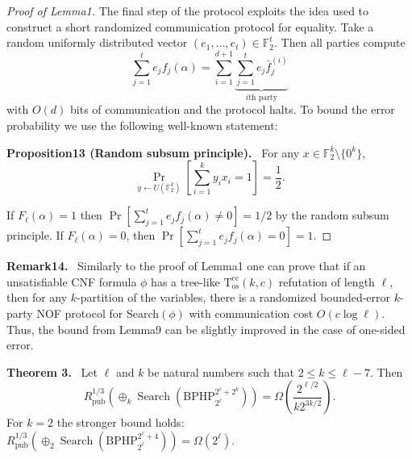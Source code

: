 \documentclass[10pt,a4paper]{article}
\newenvironment{authorclaim}[1]{\par\medskip\noindent\textbf{#1.}\ \ignorespaces}{\par\medskip}
\begin{document}
\begin{proof}[Proof of Lemma1]
The final step of the protocol exploits the idea used to construct a short randomized communication protocol for equality. Take a random uniformly distributed vector $(e_1,\ldots,e_t)\in\mathbb F_2^t$. Then all parties compute
\[\sum_{j=1}^te_jf_j(\alpha)=\sum_{i=1}^{d+1}\underbrace{\sum_{j=1}^te_j\bar f_j^{(i)}}_{i\text{th party}}\]
with $O(d)$ bits of communication and the protocol halts. To bound the error probability we use the following well-known statement:
\begin{authorclaim}{Proposition13 (Random subsum principle)}
For any $x\in\mathbb F_2^k\setminus\{0^k\}$,
\[\Pr_{y\leftarrow U(\mathbb F_2^k)}\left[\sum_{i=1}^ky_ix_i=1\right]=\frac12.\]
\end{authorclaim}
If $F_\ell(\alpha)=1$ then $\Pr[\sum_{j=1}^te_jf_j(\alpha)\ne0]=1/2$ by the random subsum principle. If $F_\ell(\alpha)=0$, then $\Pr[\sum_{j=1}^te_jf_j(\alpha)=0]=1$.
\end{proof}
\begin{authorclaim}{Remark14}
Similarly to the proof of Lemma1 one can prove that if an unsatisfiable CNF formula $\phi$ has a tree-like $\mathrm T^{\mathrm{cc}}_{\mathrm{os}}(k,c)$ refutation of length $\ell$, then for any $k$-partition of the variables, there is a randomized bounded-error $k$-party NOF protocol for Search$(\phi)$ with communication cost $O(c\log\ell)$. Thus, the bound from Lemma9 can be slightly improved in the case of one-sided error.
\end{authorclaim}

\begin{authorclaim}{Theorem 3}
Let $\ell$ and $k$ be natural numbers such that $2\le k\le\ell-7$. Then
\[
R^{1/3}_{\mathrm{pub}}(\oplus_k\operatorname{Search}(\mathrm{BPHP}_{2^\ell}^{2^\ell+2^k}))
=\Omega\left(\frac{2^{\ell/2}}{k2^{3k/2}}\right).
\]
For $k=2$ the stronger bound holds:
$R^{1/3}_{\mathrm{pub}}(\oplus_2\operatorname{Search}(\mathrm{BPHP}_{2^\ell}^{2^\ell+4}))=\Omega(2^\ell)$.
\end{authorclaim}
\end{document}

